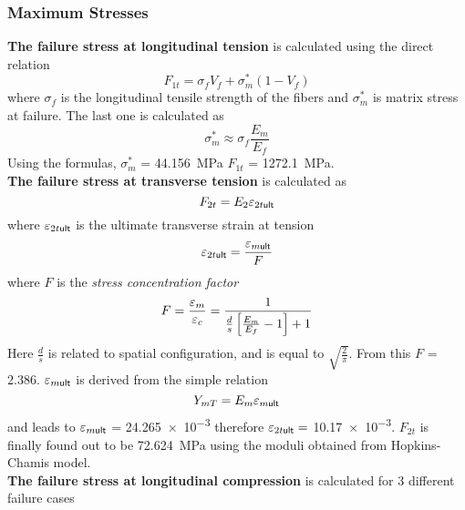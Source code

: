 \documentclass[a4paper,twosided,12pt,DIV12]{scrartcl}
\newcommand{\veps}{\vareps}
\begin{document}
\subsubsection{Maximum Stresses}
\textbf{The failure stress at longitudinal tension} is calculated using the direct relation
%
\begin{equation}
  F_{1t} = \sigma_f V_f  + \sigma_m^{*} (1-V_f)
\end{equation}
where $\sigma_f$ is the longitudinal tensile strength of the
fibers and $\sigma_m^{*}$ is matrix stress at failure. The last one is
calculated as
\begin{equation}
  \sigma_m^{*} \approx \sigma_f \frac{E_m}{E_f}
\end{equation}
Using the formulas, $\sigma_m^{*}$ = \SI{44.156}{MPa} $F_{1t}$ = \SI{1272.1}{MPa}.
%
\\\textbf{The failure stress at transverse tension} is calculated as
%
\begin{equation}
  F_{2t} = E_{2} \veps_{2t\textsf{ult}}
\end{equation}
%
where $\veps_{2t\textsf{ult}}$ is the ultimate transverse strain at tension
%
\begin{equation}
  \veps_{2t\textsf{ult}} = \frac{\veps_{m\textsf{ult}}}{F}
\end{equation}
%
where $F$ is the \emph{stress concentration factor}
%
\begin{equation}
  F = \frac{\veps_m}{\veps_c} = \frac{1}{\frac{d}{s}\sbr{\frac{E_m}{E_f}-1}+1}
\end{equation}
%
Here $\frac{d}{s}$ is related to spatial configuration, and is equal to
$\sqrt{\frac{2}{\pi}}$. From this $F$ = 2.386.
$\veps_{m\textsf{ult}}$ is derived from the simple
relation
%
\begin{equation}
  Y_{mT} = E_m \veps_{m\textsf{ult}}
\end{equation}
and leads to $\veps_{m\textsf{ult}}$ = \num{24.265e-3} therefore $\veps_{2t\textsf{ult}}=$
\num{10.17e-3}. $F_{2t}$ is finally found out to be \SI{72.624}{MPa} using the
moduli obtained from Hopkins-Chamis model.
%
\\\textbf{The failure stress at longitudinal compression} is calculated for 3
different failure cases
\end{document}

